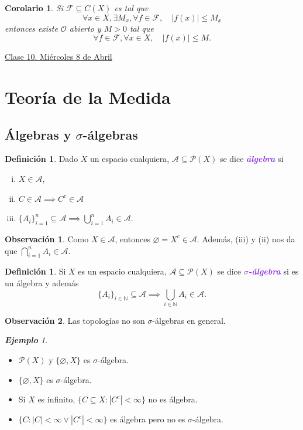\documentclass{article}
\newtheorem{corollary}[theorem]{Corolario}
\theoremstyle{definition}
\newtheorem{definition}[theorem]{Definición}
\newtheorem*{obs}{Observación}
\theoremstyle{remark}
\newtheorem{example}[theorem]{\textbf{Ejemplo}}
\numberwithin{equation}{section}
\newcommand{\A}{\mathcal{A}}
\newcommand{\N}{\mathbb{N}}
\renewcommand{\O}{\mathcal{O}}
\renewcommand{\P}{\mathcal{P}}
\newcommand{\Fcal}{\mathcal{F}}
\newcommand{\oo}{\infty}
\newcommand{\abs}[1]{\left| #1 \right|}
\newcommand{\wea}[1]{\textcolor{BlueViolet}{\textbf{\emph{#1}}}}
\newcommand{\fecha}[1]{\begin{flushright} \underline{#1} \end{flushright}}
\begin{document}
\begin{corollary}
  Si $\Fcal \subseteq C(X)$ es tal que
  \[\forall x \in X, \exists M_x, \forall f\in \Fcal, \quad \abs{f(x)} \leq M_x\]
  entonces existe $\O$ abierto y $M>0$ tal que
  \[\forall f \in \Fcal, \forall x \in X, \quad \abs{f(x)} \leq M.\]
\end{corollary}

\newpage
\fecha{Clase 10. Miércoles 8 de Abril}
\section{Teoría de la Medida}
\subsection{Álgebras y \texorpdfstring{$\sigma$}{sigma}-álgebras}

\begin{definition}
  Dado $X$ un espacio cualquiera, $\A \subseteq \P(X)$ se dice \wea{álgebra} si
  \begin{enumerate}[(i)]
    \item $X \in \A$,
    \item $C \in \A \implies C^c \in \A$
    \item $\{A_i\}_{i=1}^n \subseteq \A \implies \bigcup_{i=1}^n A_i \in \A$.
  \end{enumerate}
\end{definition}

\begin{obs}
  Como $X \in \A$, entonces $\varnothing = X^c \in \A$.
  Además, (iii) y (ii) nos da que $\bigcap_{i=1}^n A_i \in \A$.
\end{obs}

\begin{definition}
  Si $X$ es un espacio cualquiera, $\A \subseteq \P(X)$ se dice \wea{$\sigma$-álgebra} si es un álgebra y además
  \[\{A_i\}_{i\in\N} \subseteq \A \implies \bigcup_{i\in\N} A_i \in \A.\]
\end{definition}

\begin{obs}
  Las topologías no son $\sigma$-álgebras en general.
\end{obs}

\begin{example}
  \begin{itemize}
    \item $\P(X)$ y $\{\varnothing,X\}$ es $\sigma$-álgebra.
    \item $\{\varnothing,X\}$ es $\sigma$-álgebra.
    \item Si $X$ es infinito, $\{C \subseteq X \colon \abs{C^c} < \oo\}$ no es álgebra.
    \item $\{C \colon \abs{C}<\oo \lor \abs{C^c} < \oo\}$ es álgebra pero no es $\sigma$-álgebra.
  \end{itemize}
\end{example}
\end{document}
